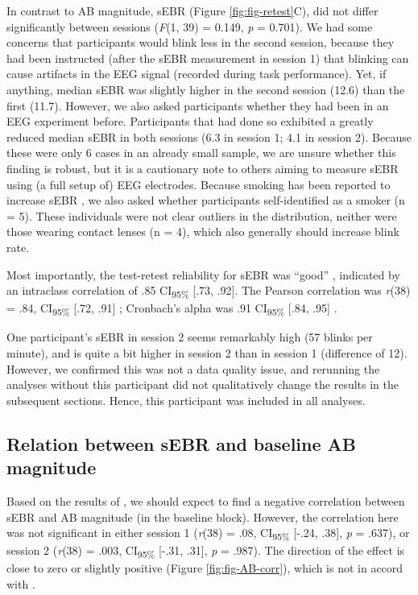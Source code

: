 \documentclass[11pt,]{memoir}
\begin{document}
In contrast to AB magnitude, sEBR (Figure \ref{fig:fig-retest}C), did not differ significantly between sessions (\emph{F}(1, 39) = 0.149, \emph{p} = 0.701). We had some concerns that participants would blink less in the second session, because they had been instructed (after the sEBR measurement in session 1) that blinking can cause artifacts in the EEG signal (recorded during task performance). Yet, if anything, median sEBR was slightly higher in the second session (12.6) than the first (11.7). However, we also asked participants whether they had been in an EEG experiment before. Participants that had done so exhibited a greatly reduced median sEBR in both sessions (6.3 in session 1; 4.1 in session 2). Because these were only 6 cases in an already small sample, we are unsure whether this finding is robust, but it is a cautionary note to others aiming to measure sEBR using (a full setup of) EEG electrodes. Because smoking has been reported to increase sEBR \autocite{Klein1993}, we also asked whether participants self-identified as a smoker (n = 5). These individuals were not clear outliers in the distribution, neither were those wearing contact lenses (n = 4), which also generally should increase blink rate.

Most importantly, the test-retest reliability for sEBR was ``good'' \autocite{Koo2016}, indicated by an intraclass correlation of .85 CI\textsubscript{95\%} {[}.73, .92{]}. The Pearson correlation was \emph{r}(38) = .84, CI\textsubscript{95\%} {[}.72, .91{]} \autocite[cf.][]{Dang2017}; Cronbach's alpha was .91 CI\textsubscript{95\%} {[}.84, .95{]} \autocite[cf.][]{Kruis2016}.

One participant's sEBR in session 2 seems remarkably high (57 blinks per minute), and is quite a bit higher in session 2 than in session 1 (difference of 12). However, we confirmed this was not a data quality issue, and rerunning the analyses without this participant did not qualitatively change the results in the subsequent sections. Hence, this participant was included in all analyses.

\hypertarget{AB_sEBR-ABmag}{%
\subsection{Relation between sEBR and baseline AB magnitude}\label{AB_sEBR-ABmag}}

Based on the results of \textcite{Colzato2008}, we should expect to find a negative correlation between sEBR and AB magnitude (in the baseline block). However, the correlation here was not significant in either session 1 (\emph{r}(38) = .08, CI\textsubscript{95\%} {[}-.24, .38{]}, \emph{p} = .637), or session 2 (\emph{r}(38) = .003, CI\textsubscript{95\%} {[}-.31, .31{]}, \emph{p} = .987). The direction of the effect is close to zero or slightly positive (Figure \ref{fig:fig-AB-corr}), which is not in accord with \textcite{Colzato2008}.
\end{document}

